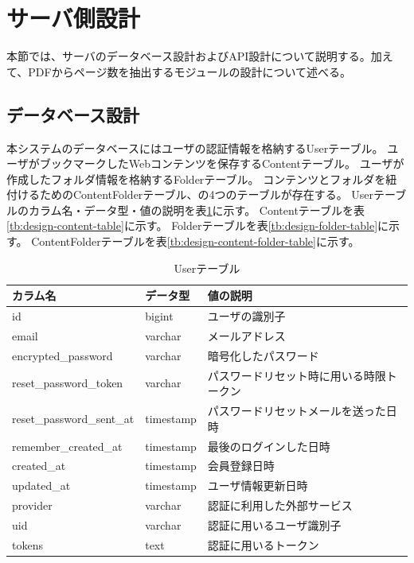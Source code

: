\section{サーバ側設計}
本節では、サーバのデータベース設計およびAPI設計について説明する。加えて、PDFからページ数を抽出するモジュールの設計について述べる。

\subsection{データベース設計}
本システムのデータベースにはユーザの認証情報を格納するUserテーブル。
ユーザがブックマークしたWebコンテンツを保存するContentテーブル。
ユーザが作成したフォルダ情報を格納するFolderテーブル。
コンテンツとフォルダを紐付けるためのContentFolderテーブル、の4つのテーブルが存在する。
Userテーブルのカラム名・データ型・値の説明を表\ref{tb:design-user-table}に示す。
Contentテーブルを表\ref{tb:design-content-table}に示す。
Folderテーブルを表\ref{tb:design-folder-table}に示す。
ContentFolderテーブルを表\ref{tb:design-content-folder-table}に示す。

\begin{table}[htbp]
  \label{tb:design-user-table}
  \caption{Userテーブル}
  \begin{center}
    \begin{tabular}{|l|l|l|}
      \hline
      カラム名 & データ型 & 値の説明 \\\hline\hline
      id & bigint & ユーザの識別子 \\\hline
      email & varchar & メールアドレス \\\hline
      encrypted\_password & varchar & 暗号化したパスワード \\\hline
      reset\_password\_token & varchar & パスワードリセット時に用いる時限トークン \\\hline
      reset\_password\_sent\_at & timestamp & パスワードリセットメールを送った日時 \\\hline
      remember\_created\_at & timestamp & 最後のログインした日時 \\\hline
      created\_at & timestamp & 会員登録日時 \\\hline
      updated\_at & timestamp & ユーザ情報更新日時 \\\hline
      provider & varchar & 認証に利用した外部サービス \\\hline
      uid & varchar & 認証に用いるユーザ識別子 \\\hline
      tokens & text & 認証に用いるトークン \\\hline
    \end{tabular}
  \end{center}
\end{table}

